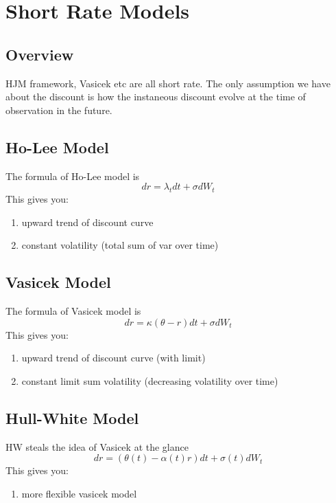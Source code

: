\newpage
\section{Short Rate Models}
\subsection{Overview}
HJM framework, Vasicek etc are all short rate. The only assumption we have about the discount is how the instaneous discount evolve at the time of observation in the future.

\subsection{Ho-Lee Model}
The formula of Ho-Lee model is
\begin{equation}
dr = \lambda_t dt + \sigma dW_t
\end{equation}
This gives you:
\begin{enumerate}
\item upward trend of discount curve
\item constant volatility (total sum of var over time)
\end{enumerate}


\subsection{Vasicek Model}
The formula of Vasicek model is
\begin{equation}
dr = \kappa (\theta - r) dt + \sigma dW_t
\end{equation}
This gives you:
\begin{enumerate}
\item upward trend of discount curve (with limit)
\item constant limit {\color{red}sum} volatility (decreasing volatility over time)
\end{enumerate}


\subsection{Hull-White Model}
HW steals the idea of Vasicek at the glance
\begin{equation}
dr = (\theta(t) - \alpha(t)r) dt + \sigma(t) dW_t
\end{equation}
This gives you:
\begin{enumerate}
\item more flexible vasicek model
\end{enumerate}

